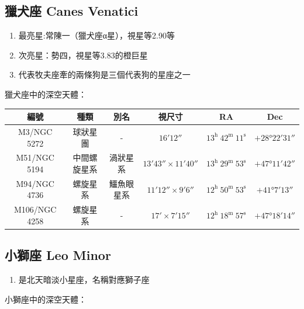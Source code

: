 \subsection{獵犬座 Canes Venatici}
\begin{enumerate}
    \item 最亮星:常陳一（獵犬座α星），視星等2.90等
    \item 次亮星：勢四，視星等3.83的橙巨星
    \item 代表牧夫座牽的兩條狗是三個代表狗的星座之一
\end{enumerate}
獵犬座中的深空天體：

\begin{center}
\begin{longtable}{c | c | c | c | c | c}
    編號 & 種類 & 別名 & 視尺寸 & RA & Dec \\
    \hline
    \endfirsthead


    \endfoot

    \endlastfoot

    M3/NGC 5272 & 球狀星團 & - & \(\ang{;16;12}\) & \(13^\text{h }42^\text{m }11^\text{s}\) & \(+\ang{28;22;31}\) \\
    M51/NGC 5194 & 中間螺旋星系 & 渦狀星系 & \(\ang{;13;43}\times\ang{;11;40}\) & \(13^\text{h }29^\text{m }53^\text{s}\) & \(+\ang{47;11;42}\) \\
    M94/NGC 4736 & 螺旋星系 & 鱷魚眼星系 & \(\ang{;11;12}\times\ang{;9;6}\) & \(12^\text{h }50^\text{m }53^\text{s}\) & \(+\ang{41;7;13}\) \\
    M106/NGC 4258 & 螺旋星系 & - & \(\ang{;17;}\times\ang{;7;15}\) & \(12^\text{h }18^\text{m }57^\text{s}\) & \(+\ang{47;18;14}\)
\end{longtable}
\end{center}

\subsection{小獅座 Leo Minor}
\begin{enumerate}
    \item 是北天暗淡小星座，名稱對應獅子座
\end{enumerate}
小獅座中的深空天體：

